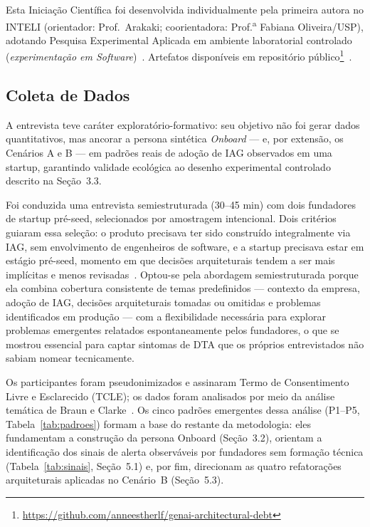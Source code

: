 \documentclass[sigconf]{acmart}
\begin{document}
Esta Iniciação Científica foi desenvolvida individualmente pela primeira autora no
INTELI (orientador: Prof.\ Arakaki; coorientadora: Prof.\textsuperscript{a} Fabiana
Oliveira/USP), adotando Pesquisa Experimental Aplicada em ambiente laboratorial
controlado (\textit{experimentação em Software})~\cite{Wohlin2012}. Artefatos
disponíveis em repositório
público\footnote{\url{https://github.com/anneestherlf/genai-architectural-debt}}~\cite{GenAIDebt2026}.

\subsection{Coleta de Dados}

A entrevista teve caráter exploratório-formativo: seu objetivo não foi gerar
dados quantitativos, mas ancorar a persona sintética \textit{Onboard} — e, por
extensão, os Cenários A e B — em padrões reais de adoção de IAG observados em
uma startup, garantindo validade ecológica ao desenho experimental controlado
descrito na Seção~3.3.

Foi conduzida uma entrevista semiestruturada (30–45 min) com dois fundadores de startup pré-seed, selecionados por amostragem intencional. Dois critérios guiaram essa seleção: o produto precisava ter sido construído integralmente via IAG, sem envolvimento de engenheiros de software, e a startup precisava estar em estágio pré-seed, momento em que decisões arquiteturais tendem a ser mais implícitas e menos revisadas~\cite{Ries2012}. Optou-se pela abordagem semiestruturada porque ela combina cobertura consistente de temas predefinidos — contexto da empresa, adoção de IAG, decisões arquiteturais tomadas ou omitidas e problemas identificados em produção — com a flexibilidade necessária para explorar problemas emergentes relatados espontaneamente pelos fundadores, o que se mostrou essencial para captar sintomas de DTA que os próprios entrevistados não sabiam nomear tecnicamente.

Os participantes foram pseudonimizados e assinaram Termo de Consentimento Livre e Esclarecido (TCLE); os dados foram analisados por meio da análise temática de Braun e Clarke~\cite{Braun2006}. Os cinco padrões emergentes dessa análise (P1–P5, Tabela~\ref{tab:padroes}) formam a base do restante da metodologia: eles fundamentam a construção da persona Onboard (Seção~3.2), orientam a identificação dos sinais de alerta observáveis por fundadores sem formação técnica (Tabela~\ref{tab:sinais}, Seção~5.1) e, por fim, direcionam as quatro refatorações arquiteturais aplicadas no Cenário~B (Seção~5.3).
\end{document}

